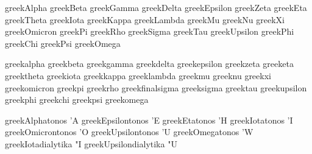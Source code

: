 \stopencoding


\startencoding[default]


 greekAlpha   {\Alpha}
 greekBeta    {\Beta}
 greekGamma   {\Gamma}
 greekDelta   {\Delta}
 greekEpsilon {\Epsilon}
 greekZeta    {\Zeta}
 greekEta     {\Eta}
 greekTheta   {\Theta}
 greekIota    {\Iota}
 greekKappa   {\Kappa}
 greekLambda  {\Lambda}
 greekMu      {\Mu}
 greekNu      {\Nu}
 greekXi      {\Xi}
 greekOmicron {\Omicron}
 greekPi      {\Pi}
 greekRho     {\Rho}
 greekSigma   {\Sigma}
 greekTau     {\Tau}
 greekUpsilon {\Upsilon}
 greekPhi     {\Phi}
 greekChi     {\Chi}
 greekPsi     {\Psi}
 greekOmega   {\Omega}


 greekalpha      {\alpha}
 greekbeta       {\beta}
 greekgamma      {\gamma}
 greekdelta      {\delta}
 greekepsilon    {\epsilon}
 greekzeta       {\zeta}
 greeketa        {\eta}
 greektheta      {\theta}
 greekiota       {\iota}
 greekkappa      {\kappa}
 greeklambda     {\lambda}
 greekmu         {\mu}
 greeknu         {\nu}
 greekxi         {\xi}
 greekomicron    {\omicron}
 greekpi         {\pi}
 greekrho        {\rho}
 greekfinalsigma {\sigma}
 greeksigma      {\sigma}
 greektau        {\tau}
 greekupsilon    {\upsilon}
 greekphi        {\phi}
 greekchi        {\chi}
 greekpsi        {\psi}
 greekomega      {\omega}


 greekAlphatonos       {'A}
 greekEpsilontonos     {'E}
 greekEtatonos         {'H}
 greekIotatonos        {'I}
 greekOmicrontonos     {'O}
 greekUpsilontonos     {'U}
 greekOmegatonos       {'W}
 greekIotadialytika    {"I}
 greekUpsilondialytika {"U}

